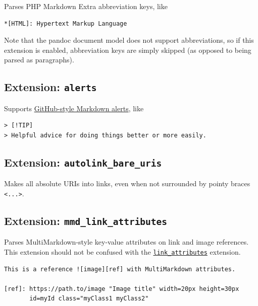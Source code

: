 \documentclass[
  b5paper
]{book}
\begin{document}
Parses PHP Markdown Extra abbreviation keys, like

\begin{verbatim}
*[HTML]: Hypertext Markup Language
\end{verbatim}

Note that the pandoc document model does not support abbreviations, so
if this extension is enabled, abbreviation keys are simply skipped (as
opposed to being parsed as paragraphs).

\subsection{\texorpdfstring{Extension:
\texttt{alerts}}{Extension: alerts}}\label{extension-alerts}

Supports
\href{https://docs.github.com/en/get-started/writing-on-github/getting-started-with-writing-and-formatting-on-github/basic-writing-and-formatting-syntax\#alerts}{GitHub-style
Markdown alerts}, like

\begin{verbatim}
> [!TIP]
> Helpful advice for doing things better or more easily.
\end{verbatim}

\subsection{\texorpdfstring{Extension:
\texttt{autolink\_bare\_uris}}{Extension: autolink\_bare\_uris}}\label{extension-autolink_bare_uris}

Makes all absolute URIs into links, even when not surrounded by pointy
braces \texttt{\textless{}...\textgreater{}}.

\subsection{\texorpdfstring{Extension:
\texttt{mmd\_link\_attributes}}{Extension: mmd\_link\_attributes}}\label{extension-mmd_link_attributes}

Parses MultiMarkdown-style key-value attributes on link and image
references. This extension should not be confused with the
\hyperref[extension-link_attributes]{\texttt{link\_attributes}}
extension.

\begin{verbatim}
This is a reference ![image][ref] with MultiMarkdown attributes.

[ref]: https://path.to/image "Image title" width=20px height=30px
       id=myId class="myClass1 myClass2"
\end{verbatim}
\end{document}

